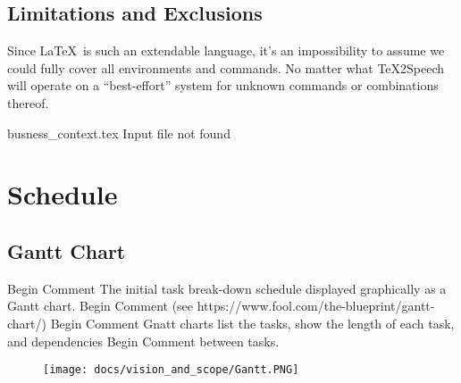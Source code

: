 \documentclass[letterpaper,12pt]{article}
\begin{document}
\subsection{Limitations and Exclusions}
Since \LaTeX\ is such an extendable language, it’s an impossibility to assume we could fully cover all environments and commands. No matter what \TeX 2Speech will operate on a “best-effort” system for unknown commands or combinations thereof.

busness_context.tex Input file not found 

\section{Schedule}

\subsection{Gantt Chart}
Begin Comment  The initial task break-down schedule displayed graphically as a Gantt chart.
Begin Comment  (see https://www.fool.com/the-blueprint/gantt-chart/)
Begin Comment  Gnatt charts list the tasks, show the length of each task, and dependencies
Begin Comment  between tasks.  
\begin{figure}[h]
\texttt{[image: docs/vision\_and\_scope/Gantt.PNG]}
\end{figure}
\end{document}
